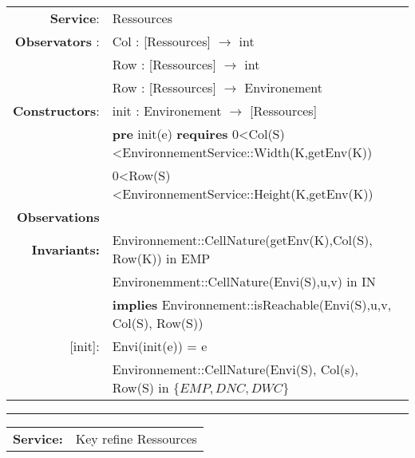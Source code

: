 \documentclass[11pt]{article}
\begin{document}
\begin{tabular}{rl}
\textbf{Service}: & Ressources\\
\textbf{Observators} : & 
Col : [Ressources] $\rightarrow$ int\\
&
Row : [Ressources] $\rightarrow$ int\\
&
Row : [Ressources] $\rightarrow$ Environement\\
\textbf{Constructors}:& init : Environement $\rightarrow$ [Ressources] \\
& \quad \textbf{pre} init(e) \textbf{requires}  0<Col(S)<EnvironnementService::Width(K,getEnv(K))\\
&
0<Row(S)<EnvironnementService::Height(K,getEnv(K))\\

\textbf{Observations}\\
\textbf{Invariants:} & Environnement::CellNature(getEnv(K),Col(S), Row(K)) in {EMP}\\
&
Environemment::CellNature(Envi(S),u,v) in {IN}\\ &
\quad \textbf{implies} Environnement::isReachable(Envi(S),u,v, Col(S), Row(S))\\

[init]: & Envi(init(e)) = e\\
& Environnement::CellNature(Envi(S), Col(s), Row(S) in $\{EMP,DNC,DWC\}$
\end{tabular}

\vspace{5mm}\hrule\vspace{5mm}
\begin{tabular}{rl}
\textbf{Service:} & \quad Key refine Ressources
\end{tabular}
\end{document}
